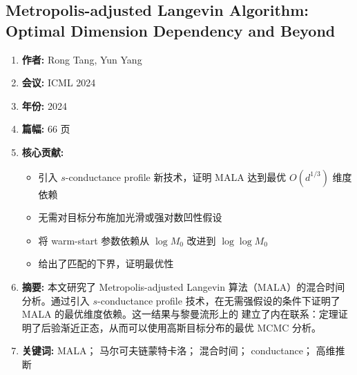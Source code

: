 \subsection{Metropolis-adjusted Langevin Algorithm: Optimal Dimension Dependency and Beyond}
\begin{enumerate}
    \item \textbf{作者:} Rong Tang, Yun Yang
    \item \textbf{会议:} ICML 2024
    \item \textbf{年份:} 2024
    \item \textbf{篇幅:} 66 页
    \item \textbf{核心贡献:}
        \begin{itemize}
            \item 引入 $s$-conductance profile 新技术，证明 MALA 达到最优 $O(d^{1/3})$ 维度依赖
            \item 无需对目标分布施加光滑或强对数凹性假设
            \item 将 warm-start 参数依赖从 $\log M_0$ 改进到 $\log\log M_0$
            \item 给出了匹配的下界，证明最优性
        \end{itemize}
    \item \textbf{摘要:} 本文研究了 Metropolis-adjusted Langevin 算法（MALA）的混合时间分析。通过引入 $s$-conductance profile 技术，在无需强假设的条件下证明了 MALA 的最优维度依赖。这一结果与黎曼流形上的 \citep{tang2023robust} 建立了内在联系：\BvM 定理证明了后验渐近正态，从而可以使用高斯目标分布的最优 MCMC 分析。
    \item \textbf{关键词:} MALA； 马尔可夫链蒙特卡洛； 混合时间； conductance； 高维推断
\end{enumerate}

